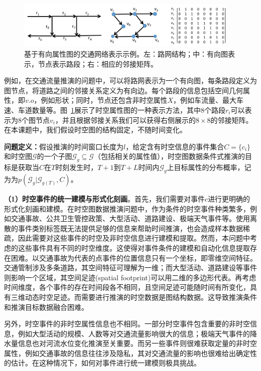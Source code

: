 \documentclass[12pt,UTF8,AutoFakeBold=2,a4paper]{ctexart} %
\newcommand{\xz}[1]{\textcolor{red}{[XZ: #1]}}
\begin{document}
\begin{figure}
\centering
\includegraphics[width=0.95\textwidth]{fig/road_graph_1.png}    
\caption{{\kaishu 基于有向属性图的交通网络表示示例。左：路网结构；中：有向图表示，节点表示路段；右：相应的邻接矩阵。}}
\label{fig:graph-1-a}
\end{figure}

例如，在交通流量推演的问题中，可以将路网表示为一个有向图，每条路段定义为图节点，将道路之间的邻接关系定义为有向边。每个路段的信息包括空间几何属性，即$v.o$，例如形状；同时，节点还包含非时空属性$X$，例如车流量、最大车速、车道数量等。图~\ref{fig:graph-1-a}展示了时空属性图的一种表示方法，其中8个路段$r_i$可以表示为8个图节点$v_i$，并且根据邻接关系我们可以获得右侧展示的$8\times8$的邻接矩阵。在本课题中，我们假设时空图的结构固定，不随时间变化。%

\textbf{问题定义：}假设推演的时间窗口长度为$l$，给定含有时空信息的事件集合$C = \{c_i\}$和时空图$\mathcal{G}$的一个子图$\mathcal{G}_g\subseteq\mathcal{G}$（包括相关的属性值），时空图数据条件式推演的目标是获取当$C$在$T$时刻发生时，$T+1$到$T+L$时间内$\mathcal{G}_g$上目标属性的分布概率，记为为$p(\mathcal{G}_g|\mathcal{G}_{g(T)}, C)$。%

\textbf{（1）时空事件的统一建模与形式化刻画}。首先，我们需要对事件$c$进行更明确的形式化刻画和建模。在时空图数据推演问题中，作为条件的时空事件种类繁多，例如交通事故、公共卫生管控政策、大型活动、道路建设、极端天气事件等。使用离散的事件类别标签既无法提供足够的信息来帮助时间推演，也会造成样本数据稀疏，因此需要对这些事件的时空及非时空信息进行建模和提取。然而，本问题中考虑的这些事件具有不同的时空维度。这使得对事件条件的建模和自动化信息提取存在困难。以交通事故为代表的点事件的位置信息只有一个坐标，即零维空间特征。交通管制涉及多条道路，其空间特征可理解为一维；而大型活动、道路建设等事件则影响一个区域，其空间足迹(spatial footprint)可以用二维的多边形代表。再考虑时间维度，各个事件的存在时间段各不相同，且空间足迹可能随时间有所变化，具有三维动态时空足迹。而需要进行推演的时空数据是图结构数据。这导致推演条件和推演目标数据融合困难。

另外，时空事件的非时空属性信息也不相同。一部分时空事件包含重要的非时空信息，例如大型活动的规模、人数等对交通流量影响很大的信息；极端天气事件的降水量信息也对河流水位变化推演至关重要。而另一些事件则很难获取定量的非时空属性，例如交通事故的信息往往涉及隐私，其对交通流量的影响也很难给出确定性的估计。在这种情况下，如何对事件进行统一建模则极具挑战。%
\end{document}
